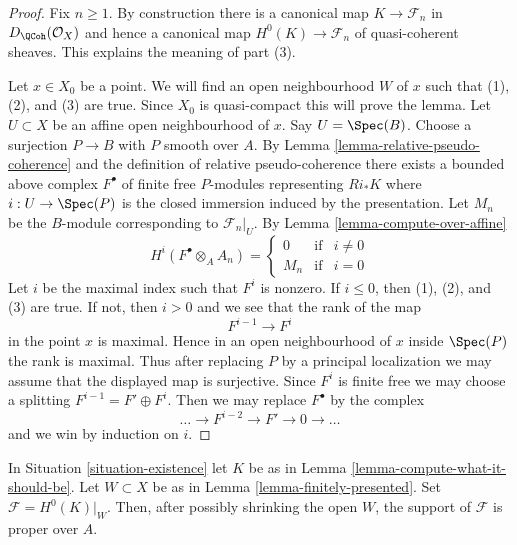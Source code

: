 \begin{proof}
Fix $n \geq 1$. By construction there is a canonical map
$K \to \mathcal{F}_n$ in $D_\QCoh(\mathcal{O}_X)$
and hence a canonical map $H^0(K) \to \mathcal{F}_n$
of quasi-coherent sheaves. This explains the meaning of part (3).

\medskip\noindent
Let $x \in X_0$ be a point.
We will find an open neighbourhood $W$
of $x$ such that (1), (2), and (3) are true. Since $X_0$ is quasi-compact
this will prove the lemma. Let $U \subset X$ be an affine open
neighbourhood of $x$. Say $U = \Spec(B)$.
Choose a surjection $P \to B$ with $P$ smooth over $A$.
By Lemma \ref{lemma-relative-pseudo-coherence}
and the definition of relative pseudo-coherence
there exists a bounded above complex $F^\bullet$
of finite free $P$-modules representing
$Ri_*K$ where $i : U \to \Spec(P)$ is the closed
immersion induced by the presentation.
Let $M_n$ be the $B$-module corresponding to $\mathcal{F}_n|_U$.
By Lemma \ref{lemma-compute-over-affine}
$$
H^i(F^\bullet \otimes_A A_n) =
\left\{
\begin{matrix}
0 & \text{if} & i \not = 0 \\
M_n & \text{if} & i = 0
\end{matrix}
\right.
$$
Let $i$ be the maximal index such that $F^i$ is nonzero.
If $i \leq 0$, then (1), (2), and (3) are true.
If not, then $i > 0$ and we see that the rank of the map
$$
F^{i - 1} \to F^i
$$
in the point $x$ is maximal. Hence in an open neighbourhood
of $x$ inside $\Spec(P)$ the rank is maximal. Thus after replacing
$P$ by a principal localization we may assume that the displayed
map is surjective. Since $F^i$ is finite free we may choose
a splitting $F^{i - 1} = F' \oplus F^i$. Then we may
replace $F^\bullet$ by the complex
$$
\ldots \to F^{i - 2} \to F' \to 0 \to \ldots
$$
and we win by induction on $i$.
\end{proof}

\begin{lemma}
\label{lemma-proper-support}
In Situation \ref{situation-existence} let $K$ be as in
Lemma \ref{lemma-compute-what-it-should-be}. Let $W \subset X$
be as in Lemma \ref{lemma-finitely-presented}.
Set $\mathcal{F} = H^0(K)|_W$. Then, after possibly shrinking the open $W$,
the support of $\mathcal{F}$ is proper over $A$.
\end{lemma}

